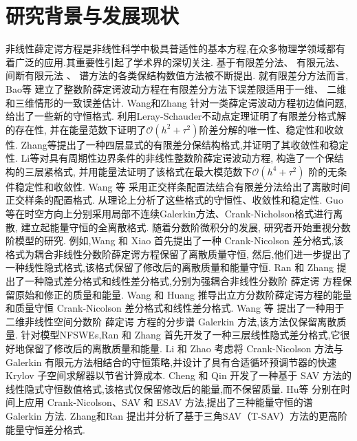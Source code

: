 \section{研究背景与发展现状}
非线性薛定谔方程是非线性科学中极具普适性的基本方程,在众多物理学领域都有着广泛的应用.其重要性引起了学术界的深切关注. 基于有限差分法\cite{liFastEnergyConserving2018}、 有限元法\cite{karakashianSpacetimeFiniteElement1998}、 间断有限元法\cite{zhangConservativeLocalDiscontinuous2017} 、 谱方法\cite{gongConservativeFourierPseudospectral2017}的各类保结构数值方法被不断提出. 
就有限差分方法而言, Bao等\cite{baoUniformErrorEstimates2012} 建立了整数阶薛定谔波动方程在有限差分方法下误差限适用于一维、 二维和三维情形的一致误差估计. 
Wang和Zhang\cite{wangAnalysisNewConservative2006} 针对一类薛定谔波动方程初边值问题, 给出了一些新的守恒格式. 利用Leray-Schauder不动点定理证明了有限差分格式解的存在性,
并在能量范数下证明了$\mathcal{O}(h^2+\tau^2)$阶差分解的唯一性、稳定性和收敛性. Zhang等\cite{zhangConservativeNumericalScheme2003}提出了一种四层显式的有限差分保结构格式,并证明了其收敛性和稳定性. 
Li等\cite{liCompactFiniteDifference2012}对具有周期性边界条件的非线性整数阶薛定谔波动方程, 构造了一个保结构的三层紧格式, 并用能量法证明了该格式在最大模范数下$\mathcal{O}(h^4+\tau^2)$ 阶的无条件稳定性和收敛性. 
Wang 等\cite{wangDiscretetimeOrthogonalSpline2011} 采用正交样条配置法结合有限差分法给出了离散时间正交样条的配置格式. 从理论上分析了这些格式的守恒性、收敛性和稳定性. 
Guo等\cite{guoEnergyConservingLocal2015}在时空方向上分别采用局部不连续Galerkin方法、Crank-Nicholson格式进行离散, 建立起能量守恒的全离散格式. 
随着分数阶微积分的发展, 研究者开始重视分数阶模型的研究.
例如,Wang 和 Xiao \cite{wangCrankNicolsonDifference2013} 首先提出了一种 Crank-Nicolson 差分格式,该格式为耦合非线性分数阶薛定谔方程保留了离散质量守恒,
然后,他们进一步提出了一种线性隐式格式,该格式保留了修改后的离散质量和能量守恒\cite{wangLinearlyImplicitConservative2014}. 
Ran 和 Zhang \cite{ranConservativeDifferenceScheme2016} 提出了一种隐式差分格式和线性差分格式,分别为强耦合非线性分数阶 薛定谔 方程保留原始和修正的质量和能量. 
Wang 和 Huang \cite{wangEnergyConservativeDifference2015,wangConservativeLinearizedDifference2015} 推导出立方分数阶薛定谔方程的能量和质量守恒 Crank-Nicolson 差分格式和线性差分格式.
Wang 等 \cite{wangSplitstepSpectralGalerkin2019} 提出了一种用于二维非线性空间分数阶 薛定谔 方程的分步谱 Galerkin 方法,该方法仅保留离散质量.
针对模型NFSWEs,Ran 和 Zhang \cite{ranLinearlyImplicitConservative2016} 首先开发了一种三层线性隐式差分格式,它很好地保留了修改后的离散质量和能量. 
Li 和 Zhao \cite{liFastEnergyConserving2018} 考虑将 Crank-Nicolson 方法与 Galerkin 有限元方法相结合的守恒策略,并设计了具有合适循环预调节器的快速 Krylov 子空间求解器以节省计算成本. 
Cheng 和 Qin \cite{chengConvergenceEnergyconservingScheme2022} 开发了一种基于 SAV 方法的线性隐式守恒数值格式,该格式仅保留修改后的能量,而不保留质量.
Hu等 \cite{huEfficientEnergyPreserving2022} 分别在时间上应用 Crank-Nicolson、SAV 和 ESAV 方法,提出了三种能量守恒的谱 Galerkin 方法.
Zhang和Ran \cite{zhangHighorderStructurepreservingDifference2023} 提出并分析了基于三角SAV（T-SAV）方法的更高阶能量守恒差分格式.

